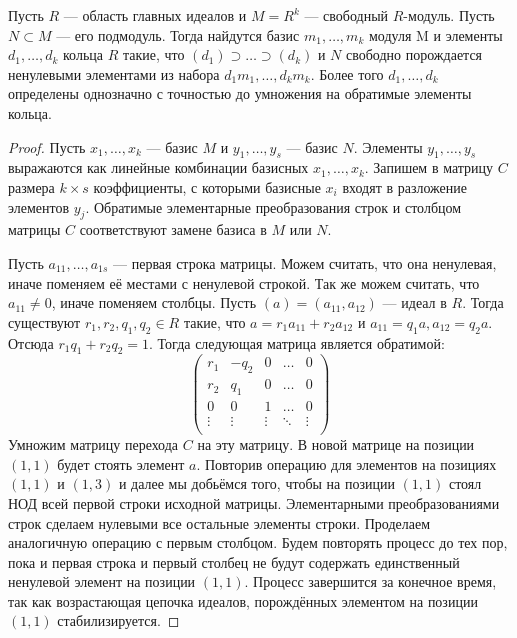 \begin{lemma} \label{submodule}
	Пусть $ R $ --- область главных идеалов и $ M = R^k $ --- свободный $ R $-модуль.
	Пусть $ N \subset M $ --- его подмодуль. 
	Тогда найдутся базис $ m_1, \ldots, m_k $ модуля M
	и элементы $ d_1, \ldots, d_k $ кольца $ R $ такие, что $ (d_1) \supset \ldots \supset (d_k) $
	и $ N $ свободно порождается
	ненулевыми элементами из набора $ d_1m_1, \ldots, d_km_k $.
	Более того $ d_1, \ldots, d_k $ определены однозначно с точностью до умножения на обратимые элементы кольца.
\end{lemma}

\begin{proof}
	Пусть $ x_1, \ldots, x_k $ --- базис $ M $
	и $ y_1, \ldots, y_s $ --- базис $ N $.
	Элементы $ y_1, \ldots, y_s $ выражаются как линейные комбинации базисных $ x_1, \ldots, x_k $.
	Запишем в матрицу $ C $ размера $ k \times s $ коэффициенты, с которыми базисные $ x_i $ 
	входят в разложение элементов $ y_j $.
	Обратимые элементарные преобразования строк и столбцом матрицы $ C $ 
	соответствуют замене базиса в $ M $ или $ N $.
	
	Пусть $ a_{11}, \ldots, a_{1s} $ --- первая строка матрицы.
	Можем считать, что она ненулевая, иначе поменяем её местами с ненулевой строкой.
	Так же можем считать, что $ a_{11} \neq 0 $, иначе поменяем столбцы.
	Пусть $ (a) = (a_{11}, a_{12}) $ --- идеал в $ R $.
	Тогда существуют $ r_1, r_2, q_1, q_2 \in R $ такие, что
	$ a = r_1a_{11} + r_2a_{12} $ и $ a_{11} = q_1a, a_{12} = q_2a $.
	Отсюда $ r_1q_1 + r_2q_2 = 1 $.
	Тогда следующая матрица является обратимой:
	$$ \begin{pmatrix}
	r_1 & -q_2 & 0 & \ldots & 0 \\
	r_2 & q_1  & 0 & \ldots & 0 \\
	0   & 0    & 1 & \ldots & 0 \\
	\vdots & \vdots & \vdots & \ddots & \vdots \\
	\end{pmatrix} $$
	Умножим матрицу перехода $ C $ на эту матрицу. 
	В новой матрице на позиции $ (1, 1) $ будет стоять элемент $ a $.
	Повторив операцию для элементов на позициях $ (1, 1) $ и $ (1, 3) $ и далее
	мы добьёмся того, чтобы на позиции $ (1, 1) $ стоял НОД всей первой строки исходной матрицы.
	Элементарными преобразованиями строк сделаем нулевыми все остальные элементы строки.
	Проделаем аналогичную операцию с первым столбцом.
	Будем повторять процесс до тех пор, 
	пока и первая строка и первый столбец не будут содержать единственный ненулевой элемент на позиции $ (1, 1) $.
	Процесс завершится за конечное время, 
	так как возрастающая цепочка идеалов, порождённых элементом на позиции $ (1, 1) $ стабилизируется.
	

\end{proof}
